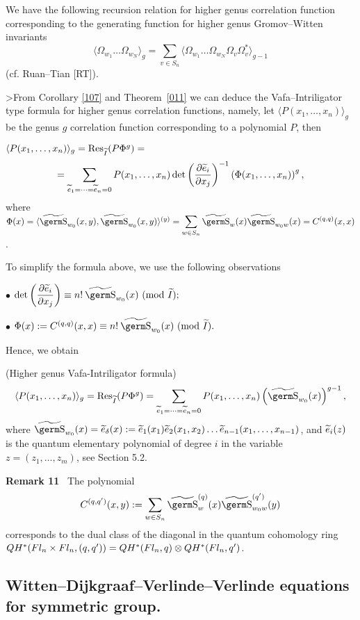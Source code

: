 {{We have the following recursion relation for higher genus correlation 
function corresponding to the generating function for higher genus 
Gromov--Witten invariants
$$\langle\Omega_{w_1}\ldots\Omega_{w_N}\rangle_g=
\sum_{v\in 
S_n}\langle\Omega_{w_1}\ldots\Omega_{w_N}\Omega_v\Omega^*_v\rangle_{g-1}
$$
(cf. Ruan--Tian [RT]).

>From Corollary \ref{107} and Theorem~\ref{011} 
we can deduce the Vafa--Intriligator type formula 
for higher genus correlation functions, namely,
let $\langle P(x_1,\ldots ,x_n)\rangle_g$ be the genus $g$
correlation function corresponding to a polynomial $P$, then

\vskip 0.2cm
\hskip 2.0cm $\langle P(x_1,\ldots ,x_n)\rangle_g=\hbox{\rm Res}_{\widetilde I}(P\Phi^g )=$
$$=\sum_{\widetilde e_1=\cdots =\widetilde e_n=0}P(x_1,\ldots ,x_n)\det\left 
(\frac{\partial\widetilde e_i}{\partial x_j}\right)^{-1}\left(\Phi (x_1,\ldots 
,x_n)\right)^g,
$$%
where $\Phi 
(x)=\langle \wt{\s}_{w_0}(x,y),\wt{\s}_{w_0}(x,y)\rangle^{(y)}=
\ds\sum_{w\in S_n}\wt{\s}_w(x)\wt{\s}_{w_0w}(x)=C^{(q,q)}(x,x)$.

To simplify the formula above, we use the following observations

$\bullet$ $\det\left(\ds\frac{\partial\wt e_i}{\partial x_j}\right)\equiv
n!\:\wt{\s}_{w_0}(x)~(\mod\wt I);$

$\bullet$ $\Phi (x):=C^{(q,q)}(x,x)\equiv n!\:\wt{\s}_{w_0}(x)~(\mod\wt I).$

Hence, we obtain
\begin{th} (Higher genus Vafa-Intriligator formula)
$$\langle P(x_1,\ldots ,x_n)\rangle_g=\Res_{\wt I}(P\Phi^g)=
\sum_{\wt e_1=\cdots =\wt e_n=0}P(x_1,\ldots ,x_n)\left(\wt{\s}_{w_0}(x)
\right)^{g-1},
$$
where $\wt{\s}_{w_0}(x)=\wt e_{\delta}(x):=\wt e_1(x_1)\wt e_2(x_1,x_2)
\ldots\wt e_{n-1}(x_1,\ldots ,x_{n-1})$, and $\widetilde e_i(z)$ is the quantum
elementary polynomial of degree $i$ in the variable $z=(z_1,\ldots ,z_m)$,
see Section 5.2.
\end{th}
{\bf Remark 11} \ The polynomial
$$C^{(q,q')}(x,y):=\sum_{w\in S_n}\wt{\s}_w^{(q)}(x)
\wt{\s}_{w_0w}^{(q')}(y)
$$
corresponds to the dual class of the diagonal in the quantum cohomology 
ring $QH^*(\hbox{$Fl_n$} \times\hbox{$Fl_n$} ,(q,q'))=QH^*(\hbox{$Fl_n$} ,q)\otimes QH^*(\hbox{$Fl_n$} ,q')$.

\subsection{Witten--Dijkgraaf--Verlinde--Verlinde equations \break 
for symmetric group.}

}}

